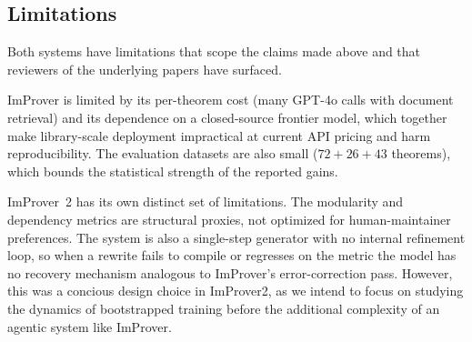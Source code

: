 


\subsection{Limitations}
\label{sec:limitations-future}

Both systems have limitations that scope the claims made above and that reviewers of the underlying papers have surfaced.

ImProver is limited by its per-theorem cost (many GPT-4o calls with document retrieval) and its dependence on a closed-source frontier model, which together make library-scale deployment impractical at current API pricing and harm reproducibility. The evaluation datasets are also small ($72 + 26 + 43$ theorems), which bounds the statistical strength of the reported gains.

ImProver~2 has its own distinct set of limitations. The modularity and dependency metrics are structural proxies, not optimized for human-maintainer preferences. The system is also a single-step generator with no internal refinement loop, so when a rewrite fails to compile or regresses on the metric the model has no recovery mechanism analogous to ImProver's error-correction pass. However, this was a concious design choice in ImProver2, as we intend to focus on studying the dynamics of bootstrapped training before the additional complexity of an agentic system like ImProver.

